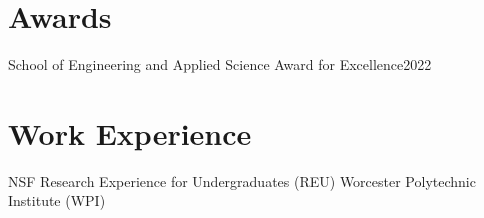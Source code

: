 \documentclass[10pt,a4paper,roman]{moderncv}        %
\begin{document}

\section{Awards}
{School of Engineering and Applied Science Award for Excellence}{2022}
{}{}

\section{Work Experience}
{NSF Research Experience for Undergraduates (REU) }
{Worcester Polytechnic Institute (WPI)}
{} {
}
\end{document}
